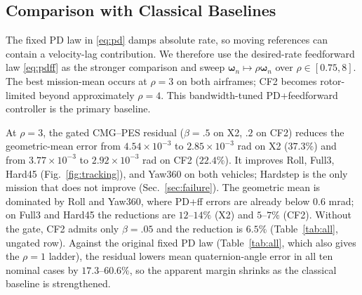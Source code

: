 \subsection{Comparison with Classical Baselines}
\label{sec:baselines}
The fixed PD law in \eqref{eq:pd} damps absolute rate, so moving references can contain a velocity-lag contribution. We therefore use the desired-rate feedforward law \eqref{eq:pdff} as the stronger comparison and sweep $\bm\omega_n\mapsto\rho\bm\omega_n$ over $\rho\in[0.75,8]$. The best mission-mean occurs at $\rho=3$ on both airframes; CF2 becomes rotor-limited beyond approximately $\rho=4$. This bandwidth-tuned PD+feedforward controller is the primary baseline.

At $\rho=3$, the gated CMG--PES residual ($\beta=.5$ on X2, $.2$ on CF2) reduces the geometric-mean error from $4.54\times10^{-3}$ to $2.85\times10^{-3}$ rad on X2 ($37.3\%$) and from $3.77\times10^{-3}$ to $2.92\times10^{-3}$ rad on CF2 ($22.4\%$). It improves Roll, Full3, Hard45 (Fig.~\ref{fig:tracking}), and Yaw360 on both vehicles; Hardstep is the only mission that does not improve (Sec.~\ref{sec:failure}). The geometric mean is dominated by Roll and Yaw360, where PD+ff errors are already below $0.6$ mrad; on Full3 and Hard45 the reductions are $12$--$14\%$ (X2) and $5$--$7\%$ (CF2). Without the gate, CF2 admits only $\beta=.05$ and the reduction is $6.5\%$ (Table~\ref{tab:all}, ungated row). Against the original fixed PD law (Table~\ref{tab:all}, which also gives the $\rho=1$ ladder), the residual lowers mean quaternion-angle error in all ten nominal cases by $17.3$--$60.6\%$, so the apparent margin shrinks as the classical baseline is strengthened.


